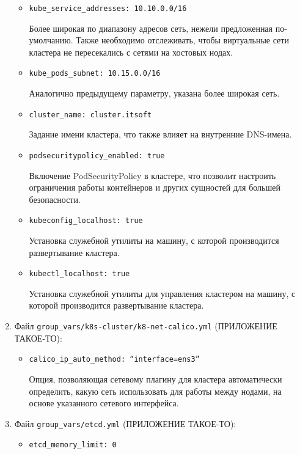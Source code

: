 \begin{enumerate}
\begin{itemize}
            \item \texttt{kube\_service\_addresses: 10.10.0.0/16}

                Более широкая по диапазону адресов сеть, нежели предложенная по-умолчанию. Также необходимо отслеживать, чтобы виртуальные сети кластера не пересекались с сетями на хостовых нодах.

            \item \texttt{kube\_pods\_subnet: 10.15.0.0/16}

                Аналогично предыдущему параметру, указана более широкая сеть.

            \item \texttt{cluster\_name: cluster.itsoft}

                Задание имени кластера, что также влияет на внутренние DNS-имена.

            \item \texttt{podsecuritypolicy\_enabled: true}

                Включение PodSecurityPolicy в кластере, что позволит настроить ограничения работы контейнеров и других сущностей для большей безопасности.

            \item \texttt{kubeconfig\_localhost: true}

                Установка служебной утилиты на машину, с которой производится развертывание кластера.

            \item \texttt{kubectl\_localhost: true}

                Установка служебной утилиты для управления кластером на машину, с которой производится развертывание кластера.

        \end{itemize}
    \item Файл \texttt{group\_vars/k8s-cluster/k8-net-calico.yml} (ПРИЛОЖЕНИЕ ТАКОЕ-ТО):
        \begin{itemize}
            \item \texttt{calico\_ip\_auto\_method: “interface=ens3”}

                Опция, позволяющая сетевому плагину для кластера автоматически определить, какую сеть использовать для работы между нодами, на основе указанного сетевого интерфейса.

        \end{itemize}
    \item Файл \texttt{group\_vars/etcd.yml} (ПРИЛОЖЕНИЕ ТАКОЕ-ТО):
        \begin{itemize}
            \item \texttt{etcd\_memory\_limit: 0}


\end{itemize}
\end{enumerate}
